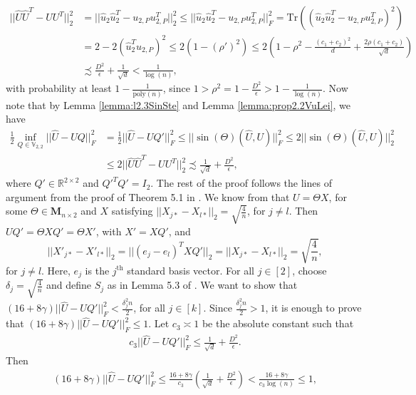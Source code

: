 \documentclass{article}
\newcommand{\Tr}{\ensuremath{\mathrm{Tr}}}
\begin{document}
\begin{align*}
||\hat{U}\hat{U}^T - UU^T||_2^2 &= ||\hat{u}_2\hat{u}_2^T - u_{2, P}u_{2, P}^T||_2^2 \leq ||\hat{u}_2\hat{u}_2^T - u_{2, P}u_{2, P}^T||_F^2 = \Tr((\hat{u}_2\hat{u}_2^T - u_{2, P}u_{2, P}^T)^2)\\
&= 2 - 2(\hat{u}_2^Tu_{2, P})^2 \leq 2(1 - (\rho')^2) \leq 2\left(1 - \rho^2-\frac{(c_1 + c_2)^2}{d} + \frac{2\rho(c_1 + c_2)}{\sqrt{d}}\right)\\
%
& \precsim \frac{D^2}{\epsilon} + \frac{1}{\sqrt{d}} < \frac{1}{\log(n)},
\end{align*}
with probability at least $1 - \frac{1}{\mathrm{poly}(n)}$, since $1 > \rho^2 = 1 - \frac{D^2}{\epsilon} > 1 - \frac{1}{\log(n)}$. Now note that by Lemma \ref{lemma:l2.3SinSte} and Lemma \ref{lemma:prop2.2VuLei}, we have
\begin{align*}
\frac{1}{2}\inf\limits_{Q \in \mathbb{V}_{2, 2}}||\hat{U} - UQ||_F^2 & = \frac{1}{2}||\hat{U} - UQ'||_F^2 \leq ||\sin(\Theta)(\hat{U}, U)||_F^2 \leq 2||\sin(\Theta)(\hat{U}, U)||_2^2 \\
%
& \leq 2||\hat{U}\hat{U}^T - UU^T||_2^2 \precsim \frac{1}{\sqrt{d}} + \frac{D^2}{\epsilon},   
\end{align*}
where $Q' \in \mathbb{R}^{2 \times 2}$ and $Q'^TQ' = I_2$. The rest of the proof follows the lines of argument from the proof of Theorem 5.1 in \cite{HehEtal22}. We know from \cite{LeiRin15} that $U = \Theta X$, for some $\Theta \in \mathbf{M}_{n\times 2}$ and $X$ satisfying $||X_{j*} - X_{l*}||_2 = \sqrt{\frac{4}{n}}$, for $j \neq l$. Then $UQ' = \Theta XQ' = \Theta X'$, with $X' = XQ'$, and
\begin{equation*}
||X'_{j*} - X'_{l*}||_2 = ||(e_j- e_l)^TXQ'||_2 = ||X_{j*} - X_{l*}||_2 = \sqrt{\frac{4}{n}},
\end{equation*}
for $j \neq l$. Here, $e_j$ is the $j^{\text{th}}$ standard basis vector. For all $j \in [2]$, choose $\delta_j = \sqrt{\frac{4}{n}}$ and define $S_j$ as in Lemma 5.3 of \cite{LeiRin15}. We want to show that $(16 + 8\gamma)||\hat{U} - UQ'||_F^2 < \frac{\delta_j^2n}{2}$, for all $j \in [k]$. Since $\frac{\delta_j^2n}{2} > 1$, it is enough to prove that $(16 + 8\gamma)||\hat{U} - UQ'||_F^2 \leq 1$. Let $c_3 \asymp 1$ be the absolute constant such that
\begin{align*}
c_3 ||\hat{U} - UQ'||_F^2 \leq \frac{1}{\sqrt{d}} + \frac{D^2}{\epsilon}.
\end{align*}
Then
\begin{align*}
(16 + 8\gamma)||\hat{U} - UQ'||_F^2 \leq \frac{16 + 8\gamma}{c_3} \left(\frac{1}{\sqrt{d}} + \frac{D^2}{\epsilon}\right) < \frac{16 + 8\gamma}{c_3\log(n)} \leq 1, 
\end{align*}
\end{document}
